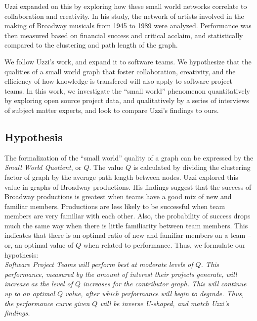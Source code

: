 \documentclass{proc}
\begin{document}
Uzzi \cite{uzzi2005collaboration} expanded on this by exploring how these small world networks correlate to collaboration and creativity. In his study, the network of artists involved in the making of Broadway musicals from 1945 to 1989 were analyzed. Performance was then measured based on financial success and critical acclaim, and statistically compared to the clustering and path length of the graph.

We follow Uzzi's work, and expand it to software teams. We hypothesize that the qualities of a small world graph that foster collaboration, creativity, and the efficiency of how knowledge is transfered\cite{latora2001efficient} will also apply to software project teams. In this work, we investigate the ``small world'' phenomenon quantitatively by exploring open source project data, and qualitatively by a series of interviews of subject matter experts, and look to compare Uzzi's findings to ours.

\subsection{Hypothesis}
The formalization of the ``small world'' quality of a graph can be expressed by the \textit{Small World Quotient}, or $Q$\cite{watts1999small,watts1998collective}. The value $Q$ is calculated by dividing the clustering factor of graph by the average path length between nodes. Uzzi explored this value in graphs of Broadway productions\cite{uzzi2005collaboration}. His findings suggest that the success of Broadway productions is greatest when teams have a good mix of new and familiar members. Productions are less likely to be successful when team members are very familiar with each other. Also, the probability of success drops much the same way when there is little familiarity between team members. This indicates that there is an optimal ratio of new and familiar members on a team -- or, an optimal value of $Q$ when related to performance. Thus, we formulate our hypothesis:\\

\textit{Software Project Teams will perform best at moderate levels of $Q$. This performance, measured by the amount of interest their projects generate, will increase as the level of $Q$ increases for the contributor graph. This will continue up to an optimal $Q$ value, after which performance will begin to degrade. Thus, the performance curve given $Q$ will be inverse U-shaped, and match Uzzi's findings\cite{uzzi2005collaboration}.}
\end{document}
